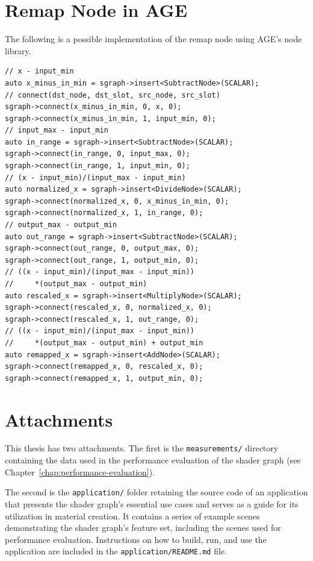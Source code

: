 \documentclass[
  digital,     %
  oneside,     %
  nosansbold,  %
  nocolorbold, %
  lof,         %
  lot,         %
]{fithesis4}
\begin{document}
\chapter{Remap Node in AGE}\label{app:remap-node}
The following is a possible implementation of the remap node using AGE's node library.
\begin{verbatim}
// x - input_min
auto x_minus_in_min = sgraph->insert<SubtractNode>(SCALAR);
// connect(dst_node, dst_slot, src_node, src_slot)
sgraph->connect(x_minus_in_min, 0, x, 0);
sgraph->connect(x_minus_in_min, 1, input_min, 0);
// input_max - input_min
auto in_range = sgraph->insert<SubtractNode>(SCALAR);
sgraph->connect(in_range, 0, input_max, 0);
sgraph->connect(in_range, 1, input_min, 0);
// (x - input_min)/(input_max - input_min)
auto normalized_x = sgraph->insert<DivideNode>(SCALAR);
sgraph->connect(normalized_x, 0, x_minus_in_min, 0);
sgraph->connect(normalized_x, 1, in_range, 0);
// output_max - output_min
auto out_range = sgraph->insert<SubtractNode>(SCALAR);
sgraph->connect(out_range, 0, output_max, 0);
sgraph->connect(out_range, 1, output_min, 0);
// ((x - input_min)/(input_max - input_min))
//     *(output_max - output_min)
auto rescaled_x = sgraph->insert<MultiplyNode>(SCALAR);
sgraph->connect(rescaled_x, 0, normalized_x, 0);
sgraph->connect(rescaled_x, 1, out_range, 0);
// ((x - input_min)/(input_max - input_min))
//     *(output_max - output_min) + output_min
auto remapped_x = sgraph->insert<AddNode>(SCALAR);
sgraph->connect(remapped_x, 0, rescaled_x, 0);
sgraph->connect(remapped_x, 1, output_min, 0);
\end{verbatim}

\chapter{Attachments}\label{app:attachments}
This thesis has two attachments. The first is the \verb|measurements/| directory containing the
data used in the performance evaluation of the shader graph (see Chapter~\ref{chap:performance-evaluation}).

The second is the \verb|application/| folder retaining the source code of an application that 
presents the shader graph’s essential use cases and serves as a guide for its utilization in material creation.
It contains a series of example scenes demonstrating the shader graph’s
feature set, including the scenes used for performance evaluation.
Instructions on how to build, run, and use the application are included in the \verb|application/README.md| file.
\end{document}

